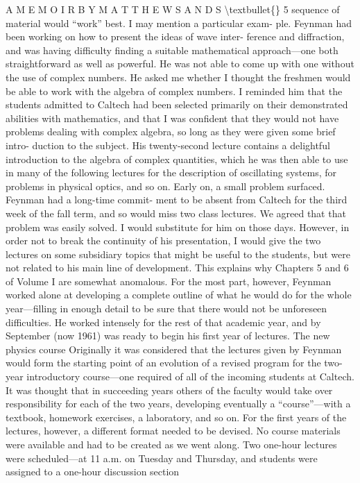 \documentclass[10pt,oneside]{article}
\begin{document}
A  M E M O I R  B Y  M A T T H E W  S A N D S \textbackslash{}textbullet\{\} 5 sequence of material would “work” best. I may mention a particular exam- ple. Feynman had been working on how to present the ideas of wave inter- ference and diffraction, and was having difficulty finding a suitable mathematical approach---one both straightforward as well as powerful. He was not able to come up with one without the use of complex numbers. He asked me whether I thought the freshmen would be able to work with the algebra of complex numbers. I reminded him that the students admitted to Caltech had been selected primarily on their demonstrated abilities with mathematics, and that I was confident that they would not have problems dealing with complex algebra, so long as they were given some brief intro- duction to the subject. His twenty-second lecture contains a delightful introduction to the algebra of complex quantities, which he was then able to use in many of the following lectures for the description of oscillating systems, for problems in physical optics, and so on. Early on, a small problem surfaced. Feynman had a long-time commit- ment to be absent from Caltech for the third week of the fall term, and so would miss two class lectures. We agreed that that problem was easily solved. I would substitute for him on those days. However, in order not to break the continuity of his presentation, I would give the two lectures on some subsidiary topics that might be useful to the students, but were not related to his main line of development. This explains why Chapters 5 and 6 of Volume I are somewhat anomalous. For the most part, however, Feynman worked alone at developing a complete outline of what he would do for the whole year---filling in enough detail to be sure that there would not be unforeseen difficulties. He worked intensely for the rest of that academic year, and by September (now 1961) was ready to begin his first year of lectures. The new physics course Originally it was considered that the lectures given by Feynman would form the starting point of an evolution of a revised program for the two- year introductory course---one required of all of the incoming students at Caltech. It was thought that in succeeding years others of the faculty would take over responsibility for each of the two years, developing eventually a “course”---with a textbook, homework exercises, a laboratory, and so on. For the first years of the lectures, however, a different format needed to be devised. No course materials were available and had to be created as we went along. Two one-hour lectures were scheduled---at 11 a.m. on Tuesday and Thursday, and students were assigned to a one-hour discussion section\par
\end{document}
